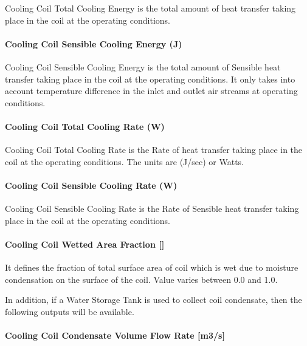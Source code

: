 Cooling Coil Total Cooling Energy is the total amount of heat transfer taking place in the coil at the operating conditions.

\paragraph{Cooling Coil Sensible Cooling Energy (J)}\label{cooling-coil-sensible-cooling-energy-j}

Cooling Coil Sensible Cooling Energy is the total amount of Sensible heat transfer taking place in the coil at the operating conditions. It only takes into account temperature difference in the inlet and outlet air streams at operating conditions.

\paragraph{Cooling Coil Total Cooling Rate (W)}\label{cooling-coil-total-cooling-rate-w}

Cooling Coil Total Cooling Rate is the Rate of heat transfer taking place in the coil at the operating conditions. The units are (J/sec) or Watts.

\paragraph{Cooling Coil Sensible Cooling Rate (W)}\label{cooling-coil-sensible-cooling-rate-w}

Cooling Coil Sensible Cooling Rate is the Rate of Sensible heat transfer taking place in the coil at the operating conditions.

\paragraph{Cooling Coil Wetted Area Fraction {[]}}\label{cooling-coil-wetted-area-fraction}

It defines the fraction of total surface area of coil which is wet due to moisture condensation on the surface of the coil. Value varies between 0.0 and 1.0.

In addition, if a Water Storage Tank is used to collect coil condensate, then the following outputs will be available.

\paragraph{Cooling Coil Condensate Volume Flow Rate {[}m3/s{]}}\label{cooling-coil-condensate-volume-flow-rate-m3s}

